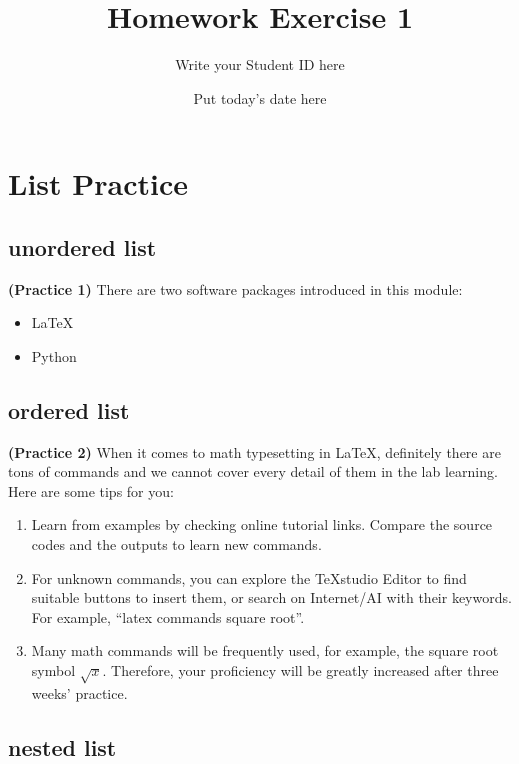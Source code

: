 \documentclass[12pt]{article}
\title{Homework Exercise 1}
\author{Write your Student ID here}
\date{Put today’s date here}
\begin{document}
\maketitle
\tableofcontents
\newpage

\section{List Practice}

\subsection{unordered list}

\textbf{(Practice 1)} There are two software packages introduced in this module:

\begin{itemize}
    \item \LaTeX
    \item Python
\end{itemize}

\subsection{ordered list}

\textbf{(Practice 2)} When it comes to math typesetting in \LaTeX, definitely there are
tons of commands and we cannot cover every detail of them in the lab learning.
Here are some tips for you:

\begin{enumerate}
    \item Learn from examples by checking online tutorial links. Compare the source
    codes and the outputs to learn new commands.

    \item For unknown commands, you can explore the TeXstudio Editor to find
    suitable buttons to insert them, or search on Internet/AI with their keywords.
    For example, ``latex commands square root''.

    \item Many math commands will be frequently used, for example, the square
    root symbol $\sqrt{x}$. Therefore, your proficiency will be greatly increased after
    three weeks’ practice.
\end{enumerate}

\subsection{nested list}
\end{document}
